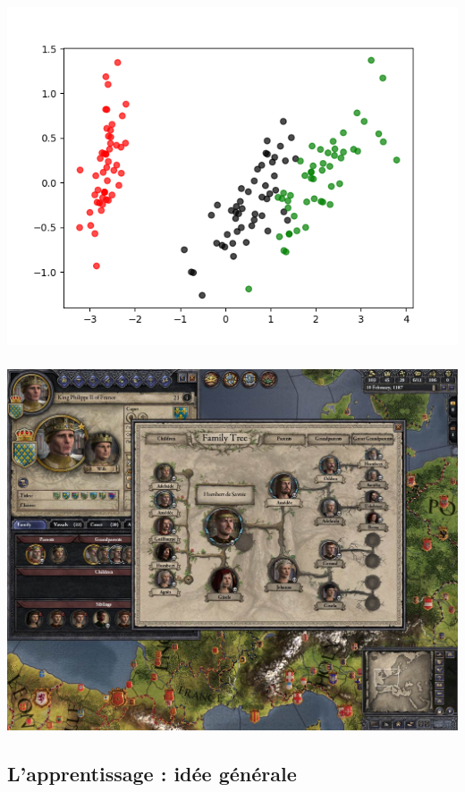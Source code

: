 \documentclass[11pt]{beamer}
\newenvironment{slide}[1]{%
\begin{frame}[environment=slide]
\frametitle{#1}
}{%
\end{frame}
}
\begin{document}
\begin{slide}{}

\includegraphics[scale=0.5]{A8classif}

\end{slide}

\begin{slide}{}

\includegraphics[scale=0.25]{A9videogames}

\end{slide}

\subsection{L'apprentissage : idée générale}
\end{document}
